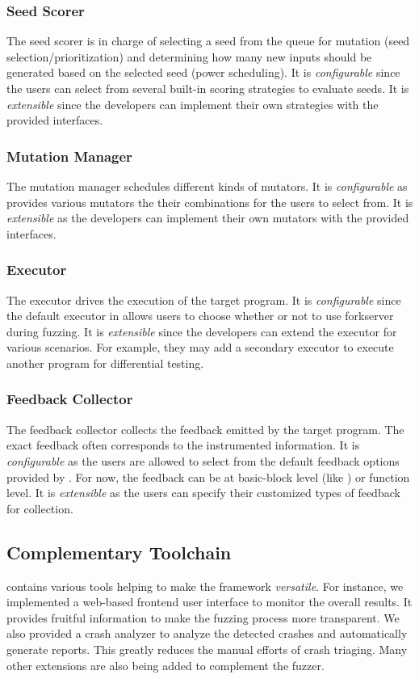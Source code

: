 \subsubsection{Seed Scorer}
The seed scorer is in charge of selecting a seed from the queue for mutation (seed selection/prioritization) and determining how many new inputs should be generated based on the selected seed (power scheduling).
It is \textit{configurable} since the users can select from several built-in scoring strategies to evaluate seeds.
It is \textit{extensible} since the developers can implement their own strategies with the provided interfaces.


\subsubsection{Mutation Manager}
The mutation manager schedules different kinds of mutators.
It is \textit{configurable} as {\FOT} provides various mutators the their combinations for the users to select from.
It is \textit{extensible} as the developers can implement their own mutators with the provided interfaces.

\subsubsection{Executor}
The executor drives the execution of the target program.
It is \textit{configurable} since the default executor in {\FOT} allows users to choose whether or not to use forkserver~\cite{afl} during fuzzing.
It is \textit{extensible} since the developers can extend the executor for various scenarios.
For example, they may add a secondary executor to execute another program for differential testing.

\subsubsection{Feedback Collector}
The feedback collector collects the feedback emitted by the target program.
The exact feedback often corresponds to the instrumented information.
It is \textit{configurable} as the users are allowed to select from the default feedback options provided by {\FOT}.
For now, the feedback can be at basic-block level (like {\AFL}) or function level.
It is \textit{extensible} as the users can specify their customized types of feedback for collection.

\subsection{Complementary Toolchain}
{\FOT} contains various tools helping to make the framework \textit{versatile}.
For instance, we implemented a web-based frontend user interface to monitor the overall results.
It provides fruitful information to make the fuzzing process more transparent.
We also provided a crash analyzer to analyze the detected crashes and automatically generate reports.
This greatly reduces the manual efforts of crash triaging.
Many other extensions are also being added to complement the fuzzer.


